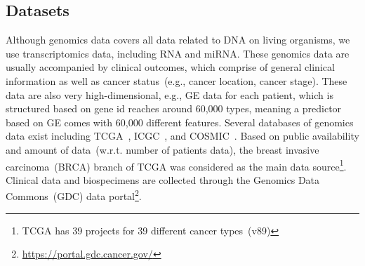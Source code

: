 \subsection{Datasets}
\label{dc}
Although genomics data covers all data related to DNA on living organisms, we use transcriptomics data, including RNA and miRNA. These genomics data are usually accompanied by clinical outcomes, which comprise of general clinical information as well as cancer status~(e.g., cancer location, cancer stage). These data are also very high-dimensional, e.g., GE data for each patient, which is structured based on gene id reaches around 60,000 types, meaning a predictor based on GE comes with 60,000 different features. Several databases of genomics data exist including TCGA~\cite{tcga}, ICGC~\cite{icgc}, and COSMIC~\cite{forbes}. Based on public availability and amount of data~(w.r.t. number of patients data), the breast invasive carcinoma~(BRCA) branch of TCGA was considered as the main data source\footnote{TCGA has 39 projects for 39 different cancer types~(v89)}. Clinical data and biospecimens are collected through the Genomics Data Commons~(GDC) data portal\footnote{\url{https://portal.gdc.cancer.gov/}}. 

